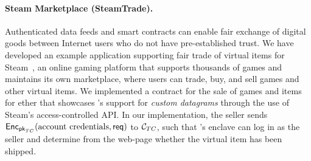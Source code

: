 \paragraph{Steam Marketplace ({\sf SteamTrade}).} 
Authenticated data feeds and smart contracts can enable
fair exchange of digital goods 
between Internet users who do not have pre-established trust.
We have developed an example application supporting
fair trade of virtual items for Steam~\cite{steam},
an online gaming platform that supports thousands of games and maintains its own marketplace, where users can trade, buy, and sell games and other virtual items.  
We implemented a contract for the sale of games and items for ether that showcases \tc's support for {\it custom datagrams} through the use of Steam's access-controlled API.
In our implementation, 
the seller sends ${\sf Enc}_{{\sf pk}_{TC}}(\text{account credentials}, {\sf req})$
to ${\cal C}_{TC}$,
such that \tc's enclave can log in as the seller  
and determine from the web-page whether the virtual item
has been shipped.



\iffalse
